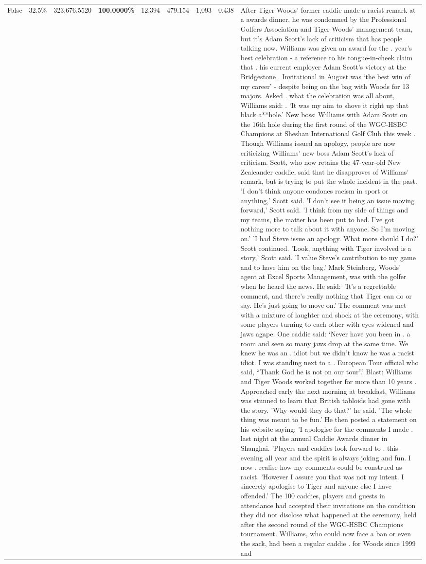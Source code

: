 \begin{table}[H]
\begin{tabular}{lllrlllll}
False & 32.5\% & 323,676.5520 & \bfseries \color{red} 100.0000\% & 12.394 & 479.154 & 1,093 & 0.438 & After Tiger Woods' former caddie made a racist remark at a awards dinner, he was condemned by the Professional Golfers Association and Tiger Woods' management team, but it's Adam Scott's lack of criticism that has people talking now. Williams was given an award for the . year’s best celebration - a reference to his tongue-in-cheek claim that . his current employer Adam Scott’s victory at the Bridgestone . Invitational in August was ‘the best win of my career’ - despite being on the bag with Woods for 13 majors. Asked . what the celebration was all about, Williams said: . ‘It was my aim to shove it right up that black a**hole.’ New boss: Williams with Adam Scott  on the 16th hole during the first round of the WGC-HSBC Champions at Sheshan International Golf Club this week . Though Williams issued an apology, people are now criticizing Williams' new boss Adam Scott's lack of criticism. Scott, who now retains the 47-year-old New Zealeander caddie, said that he disapproves of Williams' remark, but is trying to put the whole incident in the past. 'I don't think anyone condones racism in sport or anything,' Scott said. 'I don't see it being an issue moving forward,' Scott said. 'I think from my side of things and my teams, the matter has been put to bed. I've got nothing more to talk about it with anyone. So I'm moving on.' 'I had Steve issue an apology. What more should I do?' Scott continued. 'Look, anything with Tiger involved is a story,' Scott said. 'I value Steve's contribution to my game and to have him on the bag.' Mark Steinberg, Woods' agent at Excel Sports Management, was with the golfer when he heard the news. He said: 'It's a regrettable comment, and there's really nothing that Tiger can do or say. He's just going to move on.' The comment was met with a mixture of laughter and shock at the ceremony, with some players turning to each other with eyes widened and jaws agape. One caddie said: ‘Never have you been in . a room and seen so many jaws drop at the same time. We knew he was an . idiot but we didn’t know he was a racist idiot. I was standing next to a . European Tour official who said, “Thank God he is not on our tour”.’ Blast: Williams and Tiger Woods worked together for more than 10 years . Approached early the next morning at breakfast, Williams was stunned to learn that British tabloids had gone with the story. 'Why would they do that?' he said. 'The whole thing was meant to be fun.' He then posted a statement on his website saying: 'I apologise for the comments I made . last night at the annual Caddie Awards dinner in Shanghai. 'Players and caddies look forward to . this evening all year and the spirit is always joking and fun. I now . realise how my comments could be construed as racist. 'However I assure you that was not my intent. I sincerely apologise to Tiger and anyone else I have offended.' The 100 caddies, players and guests in attendance had accepted their invitations on the condition they did not disclose what happened at the ceremony, held after the second round of the WGC-HSBC Champions tournament. Williams, who could now face a ban or even the sack, had been a regular caddie . for Woods since 1999 and 
\end{tabular}
\end{table}
